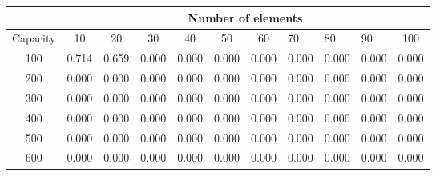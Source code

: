 \documentclass[11pt]{article}
\begin{document}
\begin{table}[h!]
\centering
\begin{tabular}{c|cccccccccc|}
\cline{2-11}
& \multicolumn{10}{c|}{Number of elements}\\ \hline
\multicolumn{1}{|c|}{Capacity} & \multicolumn{1}{c|}{10} & \multicolumn{1}{c|}{20} & \multicolumn{1}{c|}{30} & \multicolumn{1}{c|}{40} & \multicolumn{1}{c|}{50} & \multicolumn{1}{c|}{60} & \multicolumn{1}{l|}{70} & \multicolumn{1}{l|}{80} & \multicolumn{1}{l|}{90} & 100 \\ \hline
\multicolumn{1}{|c|}{100} & \multicolumn{1}{c|}{0.714} & \multicolumn{1}{c|}{0.659} & \multicolumn{1}{c|}{0.000} & \multicolumn{1}{c|}{0.000} & \multicolumn{1}{c|}{0.000} & \multicolumn{1}{c|}{0.000} & \multicolumn{1}{c|}{0.000} & \multicolumn{1}{c|}{0.000} & \multicolumn{1}{c|}{0.000}  & 0.000 \\ \hline
\multicolumn{1}{|c|}{200} & \multicolumn{1}{c|}{0.000} & \multicolumn{1}{c|}{0.000} & \multicolumn{1}{c|}{0.000} & \multicolumn{1}{c|}{0.000} & \multicolumn{1}{c|}{0.000} & \multicolumn{1}{c|}{0.000} & \multicolumn{1}{c|}{0.000} & \multicolumn{1}{c|}{0.000} & \multicolumn{1}{c|}{0.000}  & 0.000 \\ \hline
\multicolumn{1}{|c|}{300} & \multicolumn{1}{c|}{0.000} & \multicolumn{1}{c|}{0.000} & \multicolumn{1}{c|}{0.000} & \multicolumn{1}{c|}{0.000} & \multicolumn{1}{c|}{0.000} & \multicolumn{1}{c|}{0.000} & \multicolumn{1}{c|}{0.000} & \multicolumn{1}{c|}{0.000} & \multicolumn{1}{c|}{0.000}  & 0.000 \\ \hline
\multicolumn{1}{|c|}{400} & \multicolumn{1}{c|}{0.000} & \multicolumn{1}{c|}{0.000} & \multicolumn{1}{c|}{0.000} & \multicolumn{1}{c|}{0.000} & \multicolumn{1}{c|}{0.000} & \multicolumn{1}{c|}{0.000} & \multicolumn{1}{c|}{0.000} & \multicolumn{1}{c|}{0.000} & \multicolumn{1}{c|}{0.000}  & 0.000 \\ \hline
\multicolumn{1}{|c|}{500} & \multicolumn{1}{c|}{0.000} & \multicolumn{1}{c|}{0.000} & \multicolumn{1}{c|}{0.000} & \multicolumn{1}{c|}{0.000} & \multicolumn{1}{c|}{0.000} & \multicolumn{1}{c|}{0.000} & \multicolumn{1}{c|}{0.000} & \multicolumn{1}{c|}{0.000} & \multicolumn{1}{c|}{0.000}  & 0.000 \\ \hline
\multicolumn{1}{|c|}{600} & \multicolumn{1}{c|}{0.000} & \multicolumn{1}{c|}{0.000} & \multicolumn{1}{c|}{0.000} & \multicolumn{1}{c|}{0.000} & \multicolumn{1}{c|}{0.000} & \multicolumn{1}{c|}{0.000} & \multicolumn{1}{c|}{0.000} & \multicolumn{1}{c|}{0.000} & \multicolumn{1}{c|}{0.000}  & 0.000 \\ \hline

\end{tabular}
\end{table}
\end{document}
